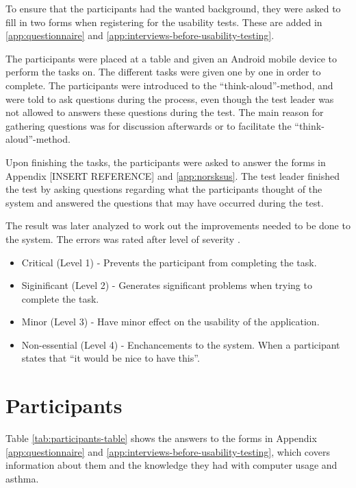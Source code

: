 To ensure that the participants had the wanted background, they were asked to fill in two forms when registering for the usability tests. These are added in \ref{app:questionnaire} and \ref{app:interviews-before-usability-testing}.


The participants were placed at a table and given an Android mobile device to perform the tasks on. The different tasks were given one by one in order to complete. The participants were introduced to the ``think-aloud''-method, and were told to ask questions during the process, even though the test leader was not allowed to answers these questions during the test. The main reason for gathering questions was for discussion afterwards or to facilitate the ``think-aloud''-method. 

Upon finishing the tasks, the participants were asked to answer the forms in Appendix [INSERT REFERENCE] and \ref{app:norsksus}. The test leader finished the test by asking questions regarding what the participants thought of the system and answered the questions that may have occurred during the test. 

The result was later analyzed to work out the improvements needed to be done to the system. The errors was rated after level of severity \cite{dumas1995practical}. 

\begin{itemize}
\item{Critical (Level 1) - Prevents the participant from completing the task.}
\item{Siginificant (Level 2) - Generates significant problems when trying to complete the task.}
\item{Minor (Level 3) - Have minor effect on the usability of the application.}
\item{Non-essential (Level 4) - Enchancements to the system. When a participant states that ``it would be nice to have this''.}
\end{itemize}


\section{Participants}
\label{sec:participants}
Table \ref{tab:participants-table} shows the answers to the forms in Appendix \ref{app:questionnaire} and \ref{app:interviews-before-usability-testing}, which covers information about them and the knowledge they had with computer usage and asthma.

